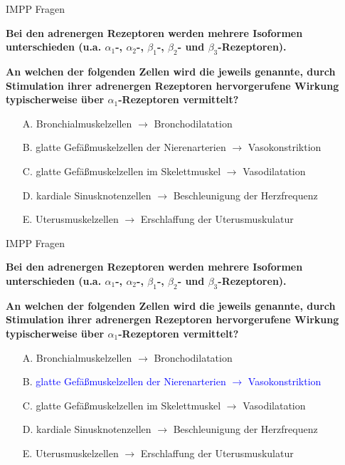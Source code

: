 \documentclass{beamer}
\begin{document}


\begin{frame}{IMPP Fragen}


\textbf{Bei den adrenergen Rezeptoren werden mehrere Isoformen unterschieden (u.a. \(\alpha_1\)-, \(\alpha_2\)-, \(\beta_1\)-, \(\beta_2\)- und \(\beta_3\)-Rezeptoren). }

\textbf{An welchen der folgenden Zellen wird die jeweils genannte, durch Stimulation ihrer adrenergen Rezeptoren hervorgerufene Wirkung typischerweise über \(\alpha_1\)-Rezeptoren vermittelt?} \\[0.2 cm]

\begin{itemize}
\item[A.] Bronchialmuskelzellen \(\rightarrow\) Bronchodilatation
\item[B.] glatte Gefäßmuskelzellen der Nierenarterien \(\rightarrow\) Vasokonstriktion %
\item[C.]  glatte Gefäßmuskelzellen  im Skelettmuskel \(\rightarrow\) Vasodilatation
\item[D.]  kardiale Sinusknotenzellen \(\rightarrow\) Beschleunigung der Herzfrequenz
\item[E.] Uterusmuskelzellen \(\rightarrow\) Erschlaffung der Uterusmuskulatur 

\end{itemize}


\end{frame}


\begin{frame}{IMPP Fragen}


\textbf{Bei den adrenergen Rezeptoren werden mehrere Isoformen unterschieden (u.a. \(\alpha_1\)-, \(\alpha_2\)-, \(\beta_1\)-, \(\beta_2\)- und \(\beta_3\)-Rezeptoren). }

\textbf{An welchen der folgenden Zellen wird die jeweils genannte, durch Stimulation ihrer adrenergen Rezeptoren hervorgerufene Wirkung typischerweise über \(\alpha_1\)-Rezeptoren vermittelt?} \\[0.2 cm]

\begin{itemize}
\item[A.] Bronchialmuskelzellen \(\rightarrow\) Bronchodilatation
\item[B.] \textcolor{blue}{glatte Gefäßmuskelzellen der Nierenarterien \(\rightarrow\) Vasokonstriktion} %
\item[C.]  glatte Gefäßmuskelzellen  im Skelettmuskel \(\rightarrow\) Vasodilatation
\item[D.]  kardiale Sinusknotenzellen \(\rightarrow\) Beschleunigung der Herzfrequenz
\item[E.] Uterusmuskelzellen \(\rightarrow\) Erschlaffung der Uterusmuskulatur 

\end{itemize}


\end{frame}
\end{document}
